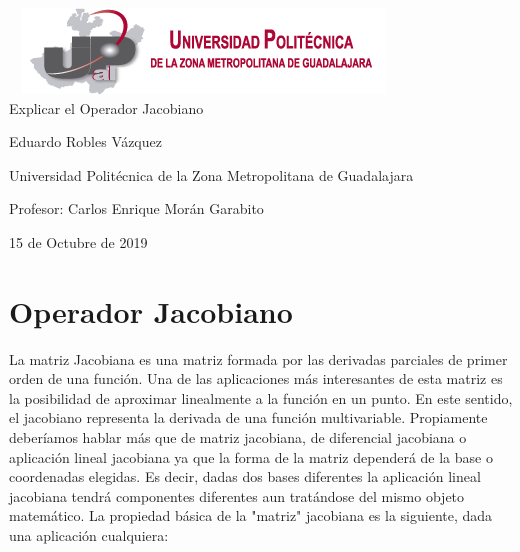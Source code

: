 \documentclass[11pt,a4paper,oldfontcommands,oneside]{memoir}
\begin{document}
%
%
\thispagestyle{empty}

{%
\sffamily
\centering
\Large

~\vspace{\fill}
\includegraphics[scale=1]{logo.png} \\
{\huge 
\vspace{4cm}
Explicar el Operador Jacobiano
}
\vspace{2.5cm}

{\LARGE
Eduardo Robles Vázquez
}

\vspace{2.5cm}

Universidad Politécnica de la Zona Metropolitana de Guadalajara

\vspace{3.5cm}

Profesor: Carlos Enrique Morán Garabito

\vspace{\fill}

15 de Octubre de 2019

}%

\vspace{.5cm}
\hfill\break
\tableofcontents*
\clearpage

\chapter{Operador Jacobiano}
La matriz Jacobiana es una matriz formada por las derivadas parciales de primer orden de una función. Una de las aplicaciones más interesantes de esta matriz es la posibilidad de aproximar linealmente a la función en un punto. En este sentido, el jacobiano representa la derivada de una función multivariable. Propiamente deberíamos hablar más que de matriz jacobiana, de diferencial jacobiana o aplicación lineal jacobiana ya que la forma de la matriz dependerá de la base o coordenadas elegidas. Es decir, dadas dos bases diferentes la aplicación lineal jacobiana tendrá componentes diferentes aun tratándose del mismo objeto matemático. La propiedad básica de la "matriz" jacobiana es la siguiente, dada una aplicación cualquiera:
\end{document}
